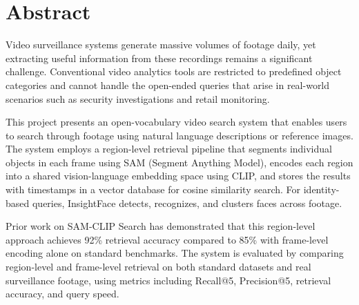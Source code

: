 \chapter*{Abstract}
\label{chap:abstract}

Video surveillance systems generate massive volumes of footage daily, yet extracting useful information from these recordings remains a significant challenge. Conventional video analytics tools are restricted to predefined object categories and cannot handle the open-ended queries that arise in real-world scenarios such as security investigations and retail monitoring.

This project presents an open-vocabulary video search system that enables users to search through footage using natural language descriptions or reference images. The system employs a region-level retrieval pipeline that segments individual objects in each frame using SAM (Segment Anything Model), encodes each region into a shared vision-language embedding space using CLIP, and stores the results with timestamps in a vector database for cosine similarity search. For identity-based queries, InsightFace detects, recognizes, and clusters faces across footage.

Prior work on SAM-CLIP Search has demonstrated that this region-level approach achieves 92\% retrieval accuracy compared to 85\% with frame-level encoding alone on standard benchmarks. The system is evaluated by comparing region-level and frame-level retrieval on both standard datasets and real surveillance footage, using metrics including Recall@5, Precision@5, retrieval accuracy, and query speed.
